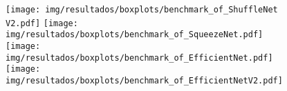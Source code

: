 \begin{figure}[h!]
	\texttt{[image: img/resultados/boxplots/benchmark\_of\_ShuffleNet V2.pdf]}
	\texttt{[image: img/resultados/boxplots/benchmark\_of\_SqueezeNet.pdf]}
	\texttt{[image: img/resultados/boxplots/benchmark\_of\_EfficientNet.pdf]}
	\texttt{[image: img/resultados/boxplots/benchmark\_of\_EfficientNetV2.pdf]}
	\caption{}
	\label{fig:Time_of_Diverse}
\end{figure}

